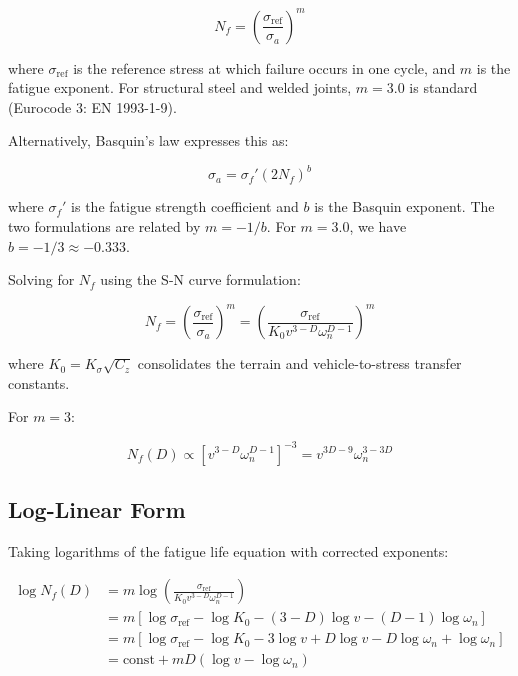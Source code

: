 \documentclass[11pt,letterpaper]{article}
\begin{document}
\begin{equation}
N_f = \left(\frac{\sigma_{\text{ref}}}{\sigma_a}\right)^m
\end{equation}

where $\sigma_{\text{ref}}$ is the reference stress at which failure occurs in one cycle, and $m$ is the fatigue exponent. For structural steel and welded joints, $m = 3.0$ is standard (Eurocode 3: EN 1993-1-9).

Alternatively, Basquin's law expresses this as:

\begin{equation}
\sigma_a = \sigma_f' (2N_f)^b
\end{equation}

where $\sigma_f'$ is the fatigue strength coefficient and $b$ is the Basquin exponent. The two formulations are related by $m = -1/b$. For $m = 3.0$, we have $b = -1/3 \approx -0.333$.

Solving for $N_f$ using the S-N curve formulation:

\begin{equation}
N_f = \left(\frac{\sigma_{\text{ref}}}{\sigma_a}\right)^m = \left(\frac{\sigma_{\text{ref}}}{K_0 v^{3-D} \omega_n^{D-1}}\right)^m
\end{equation}

where $K_0 = K_\sigma \sqrt{C_z}$ consolidates the terrain and vehicle-to-stress transfer constants.

For $m = 3$:

\begin{equation}
N_f(D) \propto [v^{3-D} \omega_n^{D-1}]^{-3} = v^{3D-9} \omega_n^{3-3D}
\end{equation}


\subsection{Log-Linear Form}

Taking logarithms of the fatigue life equation with corrected exponents:

\begin{align}
\log N_f(D) &= m \log\left(\frac{\sigma_{\text{ref}}}{K_0 v^{3-D} \omega_n^{D-1}}\right) \\
&= m[\log \sigma_{\text{ref}} - \log K_0 - (3-D)\log v - (D-1)\log \omega_n] \\
&= m[\log \sigma_{\text{ref}} - \log K_0 - 3\log v + D\log v - D\log \omega_n + \log \omega_n] \\
&= \text{const} + mD(\log v - \log \omega_n)
\end{align}
\end{document}
